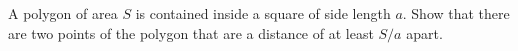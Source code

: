 A polygon of area $S$ is contained inside a square of side length $a$. Show that there are two points of the polygon that are a distance of at least $S/a$ apart.
